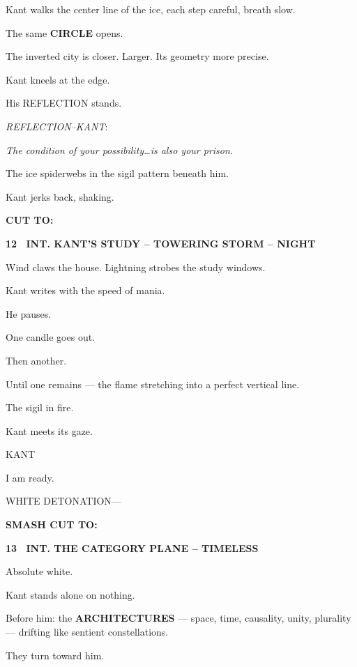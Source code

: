 \documentclass[12pt]{article}
\newcommand{\scene}[2]{%
  \vspace{1.8\baselineskip}%
  \noindent\textbf{#1 \ #2}\par\vspace{0.4\baselineskip}%
}
\newenvironment{dialogue}[1]{%
  \vspace{0.8\baselineskip}%
  \noindent\hspace*{2.3in}\textsc{#1}\par%
  \noindent\hspace*{1.5in}\begin{minipage}[t]{4.5in}%
}{%
  \end{minipage}\par%
}
\newcommand{\transition}[1]{%
  \vspace{0.6\baselineskip}%
  \begin{flushright}\textbf{#1}\end{flushright}%
}
\begin{document}
Kant walks the center line of the ice, each step careful, breath slow.

The same \textbf{CIRCLE} opens.

The inverted city is closer. Larger. Its geometry more precise.

Kant kneels at the edge.

His REFLECTION stands.

\emph{REFLECTION--KANT}:

\emph{The condition of your possibility\ldots is also your prison.}

The ice spiderwebs in the sigil pattern beneath him.

Kant jerks back, shaking.

\transition{CUT TO:}


\scene{12}{INT. KANT'S STUDY -- TOWERING STORM -- NIGHT}

Wind claws the house. Lightning strobes the study windows.

Kant writes with the speed of mania.

He pauses.

One candle goes out.

Then another.

Until one remains --- the flame stretching into a perfect vertical
line.

The sigil in fire.

Kant meets its gaze.

\begin{dialogue}{KANT}
I am ready.
\end{dialogue}

WHITE DETONATION---

\transition{SMASH CUT TO:}


\scene{13}{INT. THE CATEGORY PLANE -- TIMELESS}

Absolute white.

Kant stands alone on nothing.

Before him: the \textbf{ARCHITECTURES} --- space, time, causality, unity,
plurality --- drifting like sentient constellations.

They turn toward him.
\end{document}
